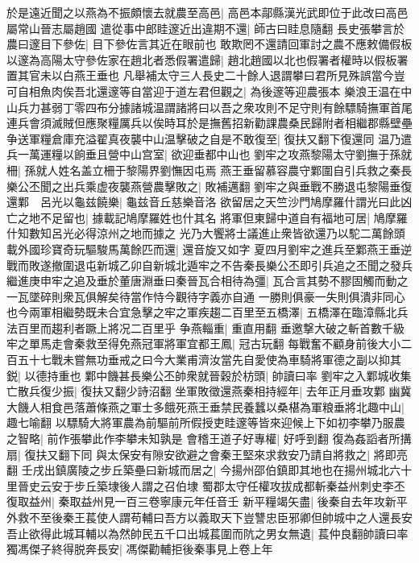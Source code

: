 於是遠近聞之以燕為不振頗懷去就農至高邑|{
	高邑本鄗縣漢光武即位于此改曰高邑屬常山晉志屬趙國}
遣從事中郎眭邃近出違期不還|{
	師古曰眭息隨翻}
長史張攀言於農曰邃目下參佐|{
	目下參佐言其近在眼前也}
敢欺罔不還請回軍討之農不應敕備假板以邃為高陽太守參佐家在趙北者悉假署遣歸|{
	趙北趙國以北也假署者權時以假板署置其官未以白燕王垂也}
凡舉補太守三人長史二十餘人退謂攀曰君所見殊誤當今豈可自相魚肉俟吾北還邃等自當迎于道左君但觀之|{
	為後邃等迎農張本}
樂浪王温在中山兵力甚弱丁零四布分據諸城温謂諸將曰以吾之衆攻則不足守則有餘驃騎撫軍首尾連兵會須滅賊但應聚糧厲兵以俟時耳於是撫舊招新勸課農桑民歸附者相繼郡縣壁壘争送軍糧倉庫充溢翟真夜襲中山温擊破之自是不敢復至|{
	復扶又翻下復還同}
温乃遣兵一萬運糧以餉垂且營中山宫室|{
	欲迎垂都中山也}
劉牢之攻燕黎陽太守劉撫于孫就柵|{
	孫就人姓名盖立柵于黎陽界劉憮因屯焉}
燕王垂留慕容農守鄴圍自引兵救之秦長樂公丕聞之出兵乘虚夜襲燕營農擊敗之|{
	敗補邁翻}
劉牢之與垂戰不勝退屯黎陽垂復還鄴　呂光以龜兹饒樂|{
	龜兹音丘慈樂音洛}
欲留居之天竺沙門鳩摩羅什謂光曰此凶亡之地不足留也|{
	據載記鳩摩羅姓也什其名}
將軍但東歸中道自有福地可居|{
	鳩摩羅什知數知呂光必得涼州之地而據之}
光乃大饗將士議進止衆皆欲還乃以駝二萬餘頭載外國珍寶奇玩驅駿馬萬餘匹而還|{
	還音旋又如字}
夏四月劉牢之進兵至鄴燕王垂逆戰而敗遂撤圍退屯新城乙卯自新城北遁牢之不告秦長樂公丕即引兵追之丕聞之發兵繼進庚申牢之追及垂於董唐淵垂曰秦晉瓦合相待為彊|{
	瓦合言其勢不膠固觸而動之一瓦墜碎則衆瓦俱解矣待當作恃今觀待字義亦自通}
一勝則俱豪一失則俱潰非同心也今兩軍相繼勢既未合宜急擊之牢之軍疾趨二百里至五橋澤|{
	五橋澤在臨漳縣北兵法百里而趨利者蹶上將况二百里乎}
争燕輜重|{
	重直用翻}
垂邀撃大破之斬首數千級牢之單馬走會秦救至得免燕冠軍將軍宜都王鳳|{
	冠古玩翻}
每戰奮不顧身前後大小二百五十七戰未嘗無功垂戒之曰今大業甫濟汝當先自愛使為車騎將軍德之副以抑其鋭|{
	以德持重也}
鄴中饑甚長樂公丕帥衆就晉穀於枋頭|{
	帥讀曰率}
劉牢之入鄴城收集亡散兵復少振|{
	復扶又翻少詩沼翻}
坐軍敗徵還燕秦相持經年|{
	去年正月垂攻鄴}
幽冀大饑人相食邑落蕭條燕之軍士多餓死燕王垂禁民養蠶以桑椹為軍粮垂將北趣中山|{
	趣七喻翻}
以驃騎大將軍農為前驅前所假授吏眭邃等皆來迎候上下如初李攀乃服農之智略|{
	前作張攀此作李攀未知孰是}
會稽王道子好專權|{
	好呼到翻}
復為姦謟者所搆扇|{
	復扶又翻下同}
與太保安有隙安欲避之會秦王堅來求救安乃請自將救之|{
	將即亮翻}
壬戌出鎮廣陵之步丘築壘曰新城而居之|{
	今揚州邵伯鎮即其地也在揚州城北六十里晉史云安于步丘築埭後人謂之召伯埭}
蜀郡太守任權攻拔成都斬秦益州刺史李丕復取益州|{
	秦取益州見一百三卷寧康元年任音壬}
新平糧竭矢盡|{
	後秦自去年攻新平}
外救不至後秦王萇使人謂苟輔曰吾方以義取天下豈讐忠臣邪卿但帥城中之人還長安吾止欲得此城耳輔以為然帥民五千口出城萇圍而阬之男女無遺|{
	萇仲良翻帥讀曰率}
獨馮傑子終得脱奔長安|{
	馮傑勸輔拒後秦事見上卷上年}
